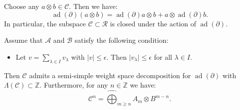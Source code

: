 \documentclass[10pt,a4paper]{amsart}
\begin{document}
\begin{Lemma}\label{Lemma R admits a ws decomposition}
Choose any $a\otimes b \in \mathscr{C}$. Then we have:
\begin{equation*}
    \operatorname{ad}(\partial)(a\otimes b)=\operatorname{ad}(\partial)a\otimes b + a \otimes \operatorname{ad}(\partial)b.
\end{equation*}
In particular, the subspace  $\mathscr{C}\subset \mathscr{R}$ is closed under the action of $\operatorname{ad}(\partial)$.
\end{Lemma}

\begin{prop}\label{prop ws decomposition of C}
Assume that $\mathscr{A}$ and $\mathscr{B}$ satisfy the following condition:
\begin{itemize}
    \item Let $v=\sum_{\lambda\in I} v_{\lambda}$ with $\vert v \vert \leq \epsilon$. Then $\vert v_{\lambda}\vert \leq \epsilon$ for all $\lambda \in I$.
\end{itemize}
Then $\mathscr{C}$ admits a semi-simple weight space decomposition for $\operatorname{ad}(\partial)$ with $\Lambda(\mathscr{C})\subset\mathbb{Z}$. Furthermore, for any $n\in \mathbb{Z}$ we have:
\begin{equation*}
    \mathscr{C}^n=\widehat{\bigoplus}_{m\geq n}A_m\otimes B^{m-n}.
\end{equation*}
\end{prop}
\end{document}
